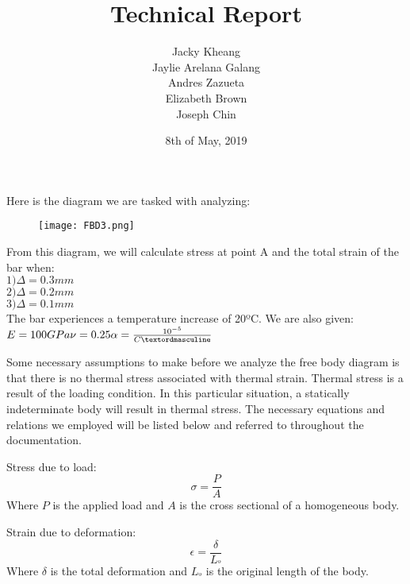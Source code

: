 \documentclass[12pt]{article}
\title{Technical Report}
\author{Jacky Kheang\\Jaylie Arelana Galang\\Andres Zazueta\\Elizabeth Brown\\Joseph Chin}
\date{8th of May, 2019}
\begin{document}
\begin{titlepage}
\maketitle
\end{titlepage}

Here is the diagram we are tasked with analyzing:
\newline

\begin{figure}[h!]
	\texttt{[image: FBD3.png]}
\end{figure}
From this diagram, we will calculate stress at point A and the total strain of the bar when:\\
\indent$1) \Delta = 0.3 mm$\\	
\indent$2) \Delta = 0.2 mm$\\ 
\indent$3) \Delta = 0.1 mm$\\

The bar experiences a temperature increase of 20ºC. We are also given:\\
$E=100 GPa\\
\nu=0.25\\
\alpha=\frac{10^{-5}}{Cº}$
\pagebreak

Some necessary assumptions to make before we analyze the free body diagram is that there is no thermal stress associated with thermal strain. Thermal stress is a result of the loading condition. In this particular situation, a statically indeterminate body will result in thermal stress. The necessary equations and relations we employed will be listed below and referred to throughout the documentation.
\newline

Stress due to load:
\begin{equation} \label{stress}
\sigma=\frac{P}{A}
\end{equation}
Where $P$ is the applied load and $A$ is the cross sectional of a homogeneous body.
\newline

Strain due to deformation:
\begin{equation} \label{strain}
\epsilon=\frac{\delta}{L_{º}}
\end{equation}
Where $\delta$ is the total deformation and $L_{º}$ is the original length of the body.
\newline
\end{document}
